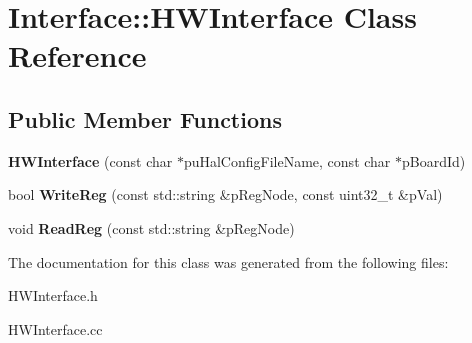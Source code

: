 \hypertarget{class_interface_1_1_h_w_interface}{\section{Interface\-:\-:H\-W\-Interface Class Reference}
\label{class_interface_1_1_h_w_interface}
}
\subsection*{Public Member Functions}
\begin{DoxyCompactItemize}
\item 
\hypertarget{class_interface_1_1_h_w_interface_a62c2107fa9f530148b5cfc6344819f05}{{\bfseries H\-W\-Interface} (const char $\ast$pu\-Hal\-Config\-File\-Name, const char $\ast$p\-Board\-Id)}\label{class_interface_1_1_h_w_interface_a62c2107fa9f530148b5cfc6344819f05}

\item 
\hypertarget{class_interface_1_1_h_w_interface_a16f82bd40bb7d6616eedf524b1f76631}{bool {\bfseries Write\-Reg} (const std\-::string \&p\-Reg\-Node, const uint32\-\_\-t \&p\-Val)}\label{class_interface_1_1_h_w_interface_a16f82bd40bb7d6616eedf524b1f76631}

\item 
\hypertarget{class_interface_1_1_h_w_interface_a5083f39fada564d34bbc53a2c7a5032c}{void {\bfseries Read\-Reg} (const std\-::string \&p\-Reg\-Node)}\label{class_interface_1_1_h_w_interface_a5083f39fada564d34bbc53a2c7a5032c}

\end{DoxyCompactItemize}


The documentation for this class was generated from the following files\-:\begin{DoxyCompactItemize}
\item 
H\-W\-Interface.\-h\item 
H\-W\-Interface.\-cc\end{DoxyCompactItemize}
